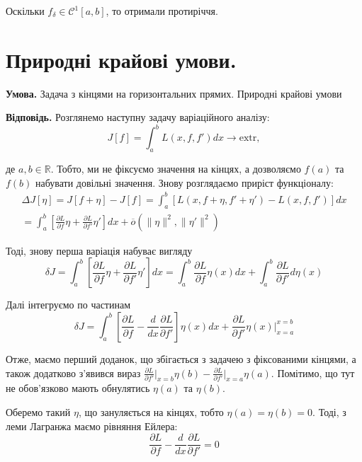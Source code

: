 \documentclass[14pt]{extarticle}
\newcommand{\<}{\langle}
\renewcommand{\>}{\rangle}
\theoremstyle{mystyle}{\newtheorem{definition}{Definition}[section]}
\theoremstyle{mystyle}{\newtheorem{proposition}[definition]{Proposition}}
\theoremstyle{mystyle}{\newtheorem{theorem}[definition]{Theorem}}
\theoremstyle{mystyle}{\newtheorem{lemma}[definition]{Lemma}}
\theoremstyle{mystyle}{\newtheorem{corollary}[definition]{Corollary}}
\theoremstyle{mystyle}{\newtheorem*{remark}{Remark}}
\theoremstyle{mystyle}{\newtheorem*{remarks}{Remarks}}
\theoremstyle{mystyle}{\newtheorem*{example}{Example}}
\theoremstyle{mystyle}{\newtheorem*{examples}{Examples}}
\theoremstyle{definition}{\newtheorem*{exercise}{Exercise}}
\theoremstyle{cstyle}{\newtheorem*{cthm}{}}
\theoremstyle{warn}
\begin{document}
Оскільки $f_{\delta} \in \mathcal{C}^1[a,b]$, то отримали протиріччя.

\pagebreak
\section{Природні крайові умови.}

\textbf{Умова.} Задача з кінцями на горизонтальних прямих. Природні крайові умови

\textbf{Відповідь.} Розглянемо наступну задачу варіаційного аналізу:
\begin{equation}
    J[f] = \int_a^b L(x,f,f')dx \to \text{extr},
\end{equation}

де $a,b \in \mathbb{R}$. Тобто, ми не фіксуємо значення на кінцях, а дозволяємо $f(a)$ та $f(b)$
набувати довільні значення. Знову розглядаємо приріст функціоналу:
\begin{gather}
    \Delta J[\eta] = J[f+\eta] - J[f] = \int_a^b [L(x,f+\eta,f'+\eta')-L(x,f,f')]dx \\= \int_a^b\left[\frac{\partial L}{\partial f}\eta + \frac{\partial L}{\partial f'}\eta'\right]dx + \overline{o}(\|\eta\|^2, \|\eta'\|^2)
\end{gather}

Тоді, знову перша варіація набуває вигляду
\begin{equation}
    \delta J = \int_a^b \left[\frac{\partial L}{\partial f}\eta + \frac{\partial L}{\partial f'}\eta'\right]dx = \int_a^b \frac{\partial L}{\partial f}\eta(x)dx + \int_a^b \frac{\partial L}{\partial f'}d\eta(x)
\end{equation}

Далі інтегруємо по частинам
\begin{equation}
    \delta J = \int_a^b \left[\frac{\partial L}{\partial f} - \frac{d}{dx}\frac{\partial L}{\partial f'}\right]\eta(x)dx + \frac{\partial L}{\partial f'}\eta(x)\Big|_{x=a}^{x=b}
\end{equation}

Отже, маємо перший доданок, що збігається з задачею з фіксованими кінцями, а також додатково з'явився вираз $\frac{\partial L}{\partial f'}\Big|_{x=b}\eta(b) - \frac{\partial L}{\partial f'}\Big|_{x=a}\eta(a)$. Помітимо, що тут не обов'язково мають обнулятись $\eta(a)$ та $\eta(b)$.

Оберемо такий $\eta$, що зануляється на кінцях, тобто $\eta(a)=\eta(b)=0$. Тоді, з леми Лагранжа маємо рівняння Ейлера:
\begin{equation}
    \frac{\partial L}{\partial f} - \frac{d}{dx}\frac{\partial L}{\partial f'} = 0
\end{equation}
\end{document}
